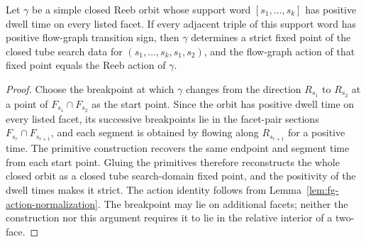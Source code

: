 \begin{unverified}
\begin{lemma}%
\label{lem:fg-simple-support-orbit-represented}
Let \(\gamma\) be a simple closed Reeb orbit whose support word
\([s_1,\ldots,s_k]\) has positive dwell time on every listed facet.  If every
adjacent triple of this support word has positive flow-graph transition sign,
then \(\gamma\) determines a strict fixed point of the closed tube search data
for \((s_1,\ldots,s_k,s_1,s_2)\), and the flow-graph action of that fixed point
equals the Reeb action of \(\gamma\).
\end{lemma}

\begin{proof}
Choose the breakpoint at which \(\gamma\) changes from the direction
\(R_{s_1}\) to \(R_{s_2}\) at a point of
\(F_{s_1}\cap F_{s_2}\) as the start point.  Since the orbit has positive dwell
time on every listed facet, its successive breakpoints lie in the facet-pair
sections
\(F_{s_r}\cap F_{s_{r+1}}\), and each segment is obtained by flowing along
\(R_{s_{r+1}}\) for a positive time.  The primitive construction recovers the
same endpoint and segment time from each start point.  Gluing the primitives
therefore reconstructs the whole closed orbit as a closed tube search-domain
fixed point, and the positivity of the dwell times makes it strict.  The action
identity follows from Lemma~\ref{lem:fg-action-normalization}.
The breakpoint may lie on additional facets; neither the construction nor this
argument requires it to lie in the relative interior of a two-face.
\end{proof}
\end{unverified}

